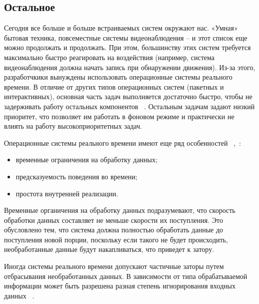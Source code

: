\subsection{Остальное}


Сегодня все больше и больше встраиваемых систем окружают нас. «Умная» бытовая
техника, повсеместные системы видеонаблюдения -- и этот список еще можно
продолжать и продолжать. При этом, большинству этих систем требуется максимально
быстро реагировать на воздействия (например, система видеонаблюдения должна начать
запись при обнаружении движения).
Из-за этого, разработчкики вынуждены использовать операционные системы
реального времени. В отличие от других типов операционных систем (пакетных и
интерактивных), основная часть задач выполняется достаточно быстро, чтобы
не задерживать работу остальных компонентов ~\cite{tanenbaum_modern_os_2015_ru}.
Остальным задачам задают низкий приоритет, что позволяет им работать в фоновом
режиме и практически не влиять на работу высокоприоритетных задач.


Операционные системы реального времени имеют еще ряд особенностей
~\cite{tanenbaum_modern_os_2015_ru},~\cite{rtos_valvano}:
\begin{itemize}
    \item временные ограничения на обработку данных;
    \item предсказуемость поведения во времени;
    \item простота внутренней реализации.
\end{itemize}

Временные органичения на обработку данных подразумевают, что скорость обработки
данных составляет не меньше скорости их поступления. Это обусловлено тем, что
система должна полностью обработать данные до поступления новой порции, поскольку
если такого не будет происходить, необработанные данные будут накапливаться,
что приведет к затору.

Иногда системы реального времени допускают частичные заторы путем отбрасывания
необработанных данных. В зависимости от типа обрабатываемой информации
может быть разрешена разная степень игнорирования входных данных
~\cite{tanenbaum_modern_os_2015_ru}.

